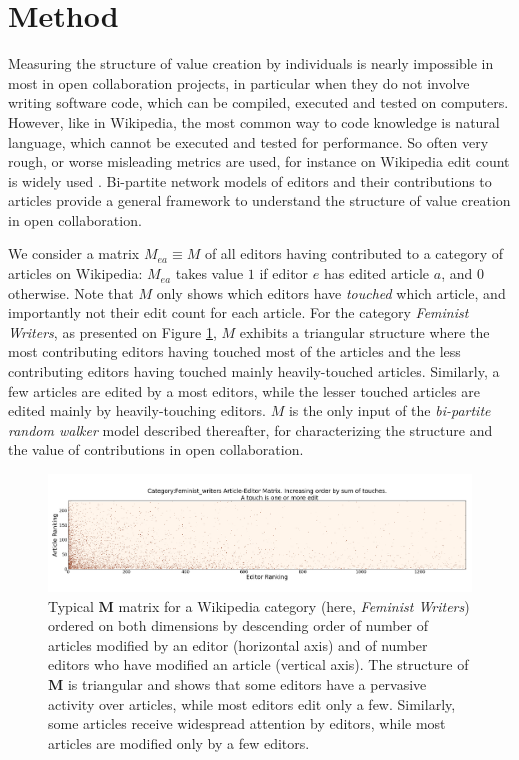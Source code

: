 \section{Method}
\label{method}
Measuring the structure of value creation by individuals is nearly impossible in most in open collaboration projects, in particular when they do not involve writing software code, which can be compiled, executed and tested on computers. However, like in Wikipedia, the most common way to code knowledge is natural language, which cannot be executed and tested for performance. So often very rough, or worse misleading metrics are used, for instance on Wikipedia edit count is widely used \cite{editcountitis}. Bi-partite network models of editors and their contributions to articles provide a general framework  to understand the structure of value creation in open collaboration. 

We consider a matrix $M_{ea} \equiv M$ of all editors having contributed to a category of articles on Wikipedia: $M_{ea}$ takes value $1$ if editor $e$ has edited article $a$, and $0$ otherwise. Note that $M$ only shows which editors have {\it touched} which article, and importantly not their edit count for each article. For the category {\it Feminist Writers}, as presented on Figure \ref{fig:triangle}, $M$ exhibits a triangular structure where the most contributing editors having touched most of the articles and the less contributing editors having touched mainly heavily-touched articles. Similarly, a few articles are edited by a most editors, while the lesser touched articles are edited mainly by heavily-touching editors. $M$ is the only input of the {\it bi-partite random walker} model described thereafter, for characterizing the structure and the value of contributions in open collaboration.

\begin{figure}[!t]
\centering
\includegraphics[width=2.0\columnwidth]{../Figures/Category_Feminist_writerstriangle_matrix_corrected.png}
\caption{Typical $\mathbf{M}$ matrix for a Wikipedia category (here, {\it Feminist Writers}) ordered on both dimensions by descending order of number of articles modified by an editor (horizontal axis) and of number editors who have modified an article (vertical axis). The structure of $\mathbf{M}$ is triangular and shows that some editors have a pervasive activity over articles, while most editors edit only a few. Similarly, some articles receive widespread attention by editors, while most articles are modified only by a few editors.}
\label{fig:triangle}
\end{figure}


